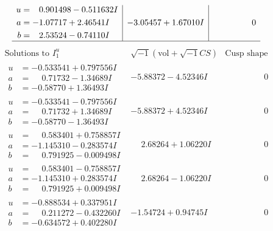 \documentclass[1p]{elsarticle_modified}
\theoremstyle{definition}
\newcommand{\I}{\sqrt{-1}}
\begin{document}
$$\begin{array}{c|c|c}
\begin{aligned}
u &= \phantom{-}0.901498 - 0.511632 I \\
a &= -1.07717 + 2.46541 I \\
b &= \phantom{-}2.53524 - 0.74110 I\end{aligned}
 & -3.05457 + 1.67010 I & \phantom{-0.000000 } 0\\
 \hline 
 \end{array}$$\newpage$$\begin{array}{c|c|c}  
\text{Solutions to }I^u_{1}& \I (\text{vol} + \sqrt{-1}CS) & \text{Cusp shape}\\
 \hline 
\begin{aligned}
u &= -0.533541 + 0.797556 I \\
a &= \phantom{-}0.71732 - 1.34689 I \\
b &= -0.58770 + 1.36493 I\end{aligned}
 & -5.88372 - 4.52346 I & \phantom{-0.000000 } 0 \\ \hline\begin{aligned}
u &= -0.533541 - 0.797556 I \\
a &= \phantom{-}0.71732 + 1.34689 I \\
b &= -0.58770 - 1.36493 I\end{aligned}
 & -5.88372 + 4.52346 I & \phantom{-0.000000 } 0 \\ \hline\begin{aligned}
u &= \phantom{-}0.583401 + 0.758857 I \\
a &= -1.145310 - 0.283574 I \\
b &= \phantom{-}0.791925 - 0.009498 I\end{aligned}
 & \phantom{-}2.68264 + 1.06220 I & \phantom{-0.000000 } 0 \\ \hline\begin{aligned}
u &= \phantom{-}0.583401 - 0.758857 I \\
a &= -1.145310 + 0.283574 I \\
b &= \phantom{-}0.791925 + 0.009498 I\end{aligned}
 & \phantom{-}2.68264 - 1.06220 I & \phantom{-0.000000 } 0 \\ \hline\begin{aligned}
u &= -0.888534 + 0.337951 I \\
a &= \phantom{-}0.211272 - 0.432260 I \\
b &= -0.634572 + 0.402280 I\end{aligned}
 & -1.54724 + 0.94745 I & \phantom{-0.000000 } 0 \\ \hline\begin{aligned}

\end{aligned}
\end{array}$$
\end{document}
